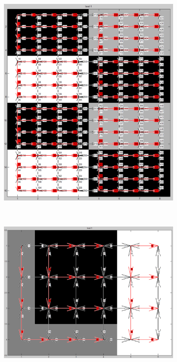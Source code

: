 \documentclass[12pt]{article}
\begin{document}
\begin{figure}[tb]
  \centering
    \begin{subfigure}[t]{0.3\textwidth}
      \includegraphics[width=\textwidth]{img/contract2.jpg}
      \caption{}\label{fig:dart_contract2}
    \end{subfigure}
    ~
    \begin{subfigure}[t]{0.3\textwidth}
      \includegraphics[width=\textwidth]{img/contract3.jpg}

\end{subfigure}
\end{figure}
\end{document}
